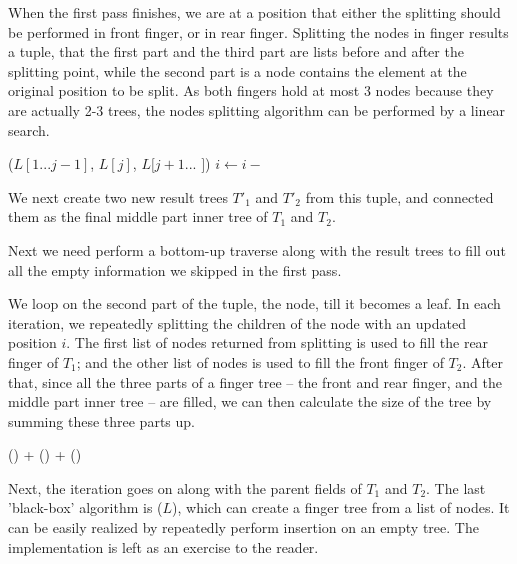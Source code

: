 \documentclass[UTF8]{article}
\begin{document}
When the first pass finishes, we are at a position that either the splitting should be performed
in front finger, or in rear finger. Splitting the nodes in finger results a tuple, that
the first part and the third part are lists before and after the splitting point, while the second
part is a node contains the element at the original position to be split.
As both fingers hold at most 3 nodes because they are actually 2-3 trees, the nodes splitting
algorithm can be performed by a linear search.

\begin{algorithmic}
      \State \Return ($L[1...j-1]$, $L[j]$, $L[j+1...$  $]$)
    \EndIf
    \State $i \gets i -$ 
  \EndFor
\EndFunction
\end{algorithmic}

We next create two new result trees $T'_1$ and $T'_2$ from this tuple, and connected them as the
final middle part inner tree of $T_1$ and $T_2$.

Next we need perform a bottom-up traverse along with the result trees to fill out all the empty
information we skipped in the first pass.

We loop on the second part of the tuple, the node, till it becomes a leaf. In each iteration, we
repeatedly splitting the children of the node with an updated position $i$. The first list of
nodes returned from splitting is used to fill the rear finger of $T_1$; and the other list of
nodes is used to fill the front finger of $T_2$. After that, since all the three parts of a
finger tree -- the front and rear finger, and the middle part inner tree -- are filled, we
can then calculate the size of the tree by summing these three parts up.

\begin{algorithmic}
  \State \Return {}() + () + ()
\EndFunction
\end{algorithmic}

Next, the iteration goes on along with the parent fields of $T_1$ and $T_2$. The last 'black-box'
algorithm is ($L$), which can create a finger tree from a list of nodes.
It can be easily realized by repeatedly perform insertion on an empty tree. The implementation
is left as an exercise to the reader.
\end{document}
